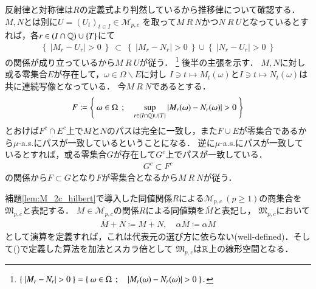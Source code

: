 	\begin{prf}
		反射律と対称律は$R$の定義式より判然しているから推移律について確認する．$M,N$とは別に$U=(U_t)_{t \in I} \in \mathcal{M}_{p,c}$
		を取って$M\ R\ N$かつ$N\ R\ U$となっているとすれば，各$r \in (I \cap \mathbb{Q}) \cup \{ T \}$にて
		\begin{align}
			\left\{\ \left|M_r - U_r\right| > 0\ \right\}\ \subset\ 
			\left\{\ \left|M_r - N_r\right| > 0\ \right\} \cup \left\{\ \left|N_r - U_r\right| > 0\ \right\}
		\end{align}
		の関係が成り立っているから$M\ R\ U$が従う．
		\footnote{
			$\left\{\ \left|M_r - N_r\right| > 0\ \right\} = \left\{\ \omega \in \Omega\ \, ; \quad \left|M_r(\omega) - N_r(\omega)\right| > 0\ \right\}.$
		}
		後半の主張を示す．
		$M,N$に対し或る零集合$E$が存在して，$\omega \in \Omega \backslash E$に対し
		$I \ni t \longmapsto M_t(\omega)$と$I \ni t \longmapsto N_t(\omega)$は共に連続写像となっている．
		今$M\ R\ N$であるとする．
		\begin{align}
			F \coloneqq \left\{\ \omega \in \Omega\ \, ; \quad \operatorname*{sup}_{r \in (I \cap \mathbb{Q}) \cup \{ T \}} \left|M_r(\omega) - N_r(\omega)\right| > 0\ \right\}
		\end{align}
		とおけば$F^c \cap E^c$上で$M$と$N$のパスは完全に一致し，また$F \cup E$が零集合であるから$\mu$-a.s.にパスが一致しているということになる．
		逆に$\mu$-a.s.にパスが一致しているとすれば，或る零集合$G$が存在して$G^c$上でパスが一致している．
		\begin{align}
			G^c \subset F^c
		\end{align}
		の関係から$F \subset G$となり$F$が零集合となるから$M\ R\ N$が従う．
		\QED
	\end{prf}
	
	\begin{itembox}[l]{}
		\begin{lem}
			補題\ref{lem:M_2c_hilbert}で導入した同値関係$R$による$\mathcal{M}_{p,c}\ (p \geq 1)$の商集合を$\mathfrak{M}_{p,c}$と表記する．
			$M \in \mathcal{M}_{p,c}$の関係$R$による同値類を$\overline{M}$と表記し，
			$\mathfrak{M}_{p,c}$において
			\begin{align}
				\overline{M} + \overline{N} \coloneqq \overline{M+N}, \quad \alpha \overline{M} \coloneqq \overline{\alpha M} \label{eq:mart_linear_arithmetic}
			\end{align}
			として演算を定義すれば，これは代表元の選び方に依らない(well-defined)．そして()で定義した算法を加法とスカラ倍として
			$\mathfrak{M}_{p,c}$は$\mathbb{R}$上の線形空間となる．
		\end{lem}
	\end{itembox}
	
